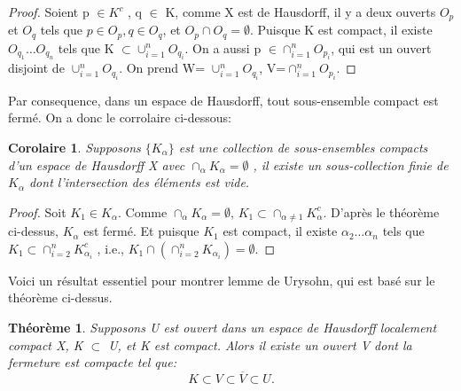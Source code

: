 \documentclass{article}
\newtheorem{theorem}{Théorème}[section]
\newtheorem{corollary}{Corolaire}[theorem]
\begin{document}
\begin{proof}
    Soient p $\in K^{c}$ ,  q $\in$ K, comme X est de Hausdorff, il y a deux ouverts  $O_{p}$  et  $O_{q}$ tels que $p\in O{_p}, q\in O_{q}$, et $O_{p} \cap O_{q} = \emptyset$. Puisque K est compact, il existe $O_{q_1} \ldots O_{q_n}$ tels que K $\subset \cup_{i=1}^n O_{q_i}$. On a aussi p $\in \cap_{i=1}^n O_{p_i}$, qui est un ouvert disjoint de $\cup_{i=1}^n O_{q_i}$. On prend W= $\cup_{i=1}^n O_{q_i}$, V=$\cap_{i=1}^n O_{p_i}$.
\end{proof}

Par consequence, dans un espace de Hausdorff, tout sous-ensemble compact est fermé. On a donc le corrolaire ci-dessous:

\begin{corollary}
Supposons $\{ K_{\alpha } \} $ est une collection de sous-ensembles compacts d'un espace de Hausdorff X avec $\cap_{\alpha }K_{\alpha}=\emptyset$ , il existe un sous-collection finie de ${K_{\alpha }}$ dont l'intersection des éléments est vide.
\end{corollary}

\begin{proof}
    Soit $K_{1} \in {K_{\alpha}}$. Comme $\cap_{\alpha }K_{\alpha}=\emptyset$, $K_{1} \subset \cap_{\alpha \neq 1}K_{\alpha}^{c}$. D'après le théorème ci-dessus, $K_{\alpha}$ est fermé. Et puisque $K_{1}$ est compact, il existe $\alpha_{2} \dots \alpha_{n}$ tels que $K_{1} \subset \cap_{i=2}^n  K_{\alpha_{i}}^{c}$ , i.e., $K_{1} \cap (\cap_{i = 2}^{n} K_{\alpha_{i}} ) = \emptyset$.
\end{proof}

Voici un résultat essentiel pour montrer lemme de Urysohn, qui est basé sur le théorème ci-dessus.
\begin{theorem}
      Supposons U est ouvert dans un espace de Hausdorff localement compact X, K $\subset$ U, et K est compact. Alors il existe un ouvert V dont la fermeture est compacte tel que: 
      \[K \subset V \subset \overline{V} \subset U.\] 
\end{theorem}
\end{document}
